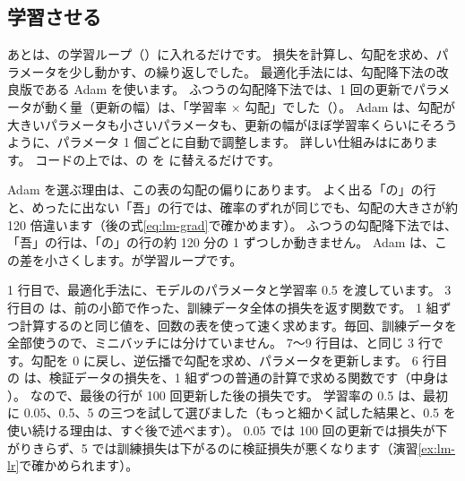 \subsection*{学習させる}

あとは、の学習ループ（）に入れるだけです。
損失を計算し、勾配を求め、パラメータを少し動かす、の繰り返しでした。
最適化手法には、勾配降下法の改良版である Adam を使います。
ふつうの勾配降下法では、1 回の更新でパラメータが動く量（更新の幅）は、「学習率 $\times$ 勾配」でした（）。
Adam は、勾配が大きいパラメータも小さいパラメータも、更新の幅がほぼ学習率くらいにそろうように、パラメータ 1 個ごとに自動で調整します。
詳しい仕組みはにあります。
コードの上では、の  を  に替えるだけです。

Adam を選ぶ理由は、この表の勾配の偏りにあります。
よく出る「の」の行と、めったに出ない「吾」の行では、確率のずれが同じでも、勾配の大きさが約 120 倍違います（後の式\eqref{eq:lm-grad}で確かめます）。
ふつうの勾配降下法では、「吾」の行は、「の」の行の約 120 分の 1 ずつしか動きません。
Adam は、この差を小さくします。が学習ループです。

\par{} %

1 行目で、最適化手法に、モデルのパラメータと学習率 0.5 を渡しています。
3 行目の  は、前の小節で作った、訓練データ全体の損失を返す関数です。
1 組ずつ計算するのと同じ値を、回数の表を使って速く求めます。毎回、訓練データを全部使うので、ミニバッチには分けていません。
7〜9 行目は、と同じ 3 行です。勾配を 0 に戻し、逆伝播で勾配を求め、パラメータを更新します。
6 行目の  は、検証データの損失を、1 組ずつの普通の計算で求める関数です（中身は ）。
 なので、最後の行が 100 回更新した後の損失です。
学習率の 0.5 は、最初に 0.05、0.5、5 の三つを試して選びました（もっと細かく試した結果と、0.5 を使い続ける理由は、すぐ後で述べます）。
0.05 では 100 回の更新では損失が下がりきらず、5 では訓練損失は下がるのに検証損失が悪くなります（演習\ref{ex:lm-lr}で確かめられます）。

